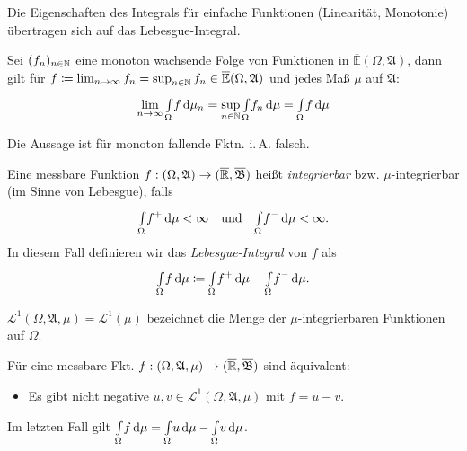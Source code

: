 \documentclass{cheat-sheet}
\newcommand{\ER}{\overline\R} %
\newcommand{\Alg}{\mathfrak{A}} %
\newcommand{\Bor}{\mathfrak{B}} %
\newcommand{\E}{\mathbb{E}} %
\newcommand{\Leb}{\mathcal{L}} %
\newcommand{\IntOmu}[1]{\Int{\Omega}{}{#1}{\mu}} %
\begin{document}
\begin{satz}
  Die Eigenschaften des Integrals für einfache Funktionen (Linearität, Monotonie) übertragen sich auf das Lebesgue-Integral.
\end{satz}

\begin{satz}
  Sei $(f_n)_{n \in \mathbb{N}}$ eine monoton wachsende Folge von Funktionen in $\overline{\E}(\Omega, \Alg)$, dann gilt für $f \coloneqq \lim_{n \to \infty} f_n = \sup_{n \in \N} f_n \in \overline{\E}(\Omega, \Alg)$ und jedes Maß $\mu$ auf $\Alg$:
  \[ \lim_{n \to \infty} \IntOmu f_n = \sup_{n \in \N} \IntOmu{f_n} = \IntOmu{f} \]
\end{satz}

\begin{bem}
  Die Aussage ist für monoton fallende Fktn. i.\,A. falsch.
\end{bem}

\begin{defn}
  Eine messbare Funktion $f : (\Omega, \Alg) \to (\ER, \overline{\Bor})$ heißt \emph{integrierbar} bzw. $\mu$-integrierbar (im Sinne von Lebesgue), falls
  \[ \IntOmu{f^+} < \infty \quad \text{und} \quad \IntOmu{f^-} < \infty. \]
  In diesem Fall definieren wir das \emph{Lebesgue-Integral} von $f$ als
  \[ \IntOmu{f} \coloneqq \IntOmu{f^+} - \IntOmu{f^-}. \]
\end{defn}

\begin{nota}
  $\Leb^1(\Omega, \Alg, \mu) = \Leb^1(\mu)$ bezeichnet die Menge der $\mu$-integrierbaren Funktionen auf $\Omega$.
\end{nota}

\begin{satz}
  Für eine messbare Fkt. $f : (\Omega, \Alg, \mu) \to (\ER, \overline{\Bor})$ sind äquivalent:
  \begin{itemize}
    \item Es gibt nicht negative $u, v \in \Leb^1(\Omega, \Alg, \mu)$ mit $f = u - v$.
  \end{itemize}
  Im letzten Fall gilt $\IntOmu{f} = \IntOmu{u} - \IntOmu{v}$.
\end{satz}
\end{document}
